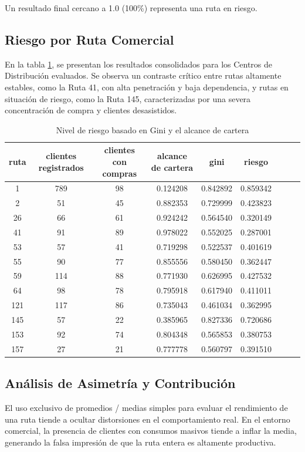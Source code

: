 \documentclass[12pt, letterpaper]{article}
\begin{document}
Un resultado final cercano a 1.0 (100\%) representa una ruta en riesgo.

\subsection{Riesgo por Ruta Comercial}
En la tabla \ref{tab:nivel_riesgo}, se presentan los resultados consolidados para los Centros de Distribución evaluados.
Se observa un contraste crítico entre rutas altamente estables, como la Ruta 41, con alta penetración y baja dependencia,
y rutas en situación de riesgo, como la Ruta 145, caracterizadas por una severa concentración de compra y clientes desasistidos.


\begin{table}[htbp]
\caption{Nivel de riesgo basado en Gini y el alcance de cartera}
\label{tab:nivel_riesgo}
\begin{tabular}{ccccccccc}
\toprule
ruta & clientes registrados & clientes con compras & alcance de cartera & gini & riesgo \\
\midrule
1 & 789 & 98 & 0.124208 & 0.842892 & 0.859342 \\
2 & 51 & 45 & 0.882353 & 0.729999 & 0.423823 \\
26 & 66 & 61 & 0.924242 & 0.564540 & 0.320149 \\
41 & 91 & 89 & 0.978022 & 0.552025 & 0.287001 \\
53 & 57 & 41 & 0.719298 & 0.522537 & 0.401619 \\
55 & 90 & 77 & 0.855556 & 0.580450 & 0.362447 \\
59 & 114 & 88 & 0.771930 & 0.626995 & 0.427532 \\
64 & 98 & 78 & 0.795918 & 0.617940 & 0.411011 \\
121 & 117 & 86 & 0.735043 & 0.461034 & 0.362995 \\
145 & 57 & 22 & 0.385965 & 0.827336 & 0.720686 \\
153 & 92 & 74 & 0.804348 & 0.565853 & 0.380753 \\
157 & 27 & 21 & 0.777778 & 0.560797 & 0.391510 \\
\bottomrule
\end{tabular}
\end{table}

\subsection{Análisis de Asimetría y Contribución}

El uso exclusivo de promedios / medias simples para evaluar el rendimiento de una ruta tiende a ocultar distorsiones en el comportamiento real.
En el entorno comercial, la presencia de clientes con consumos masivos tiende a inflar la media, generando la falsa impresión de que la ruta entera es altamente productiva. 
\end{document}

